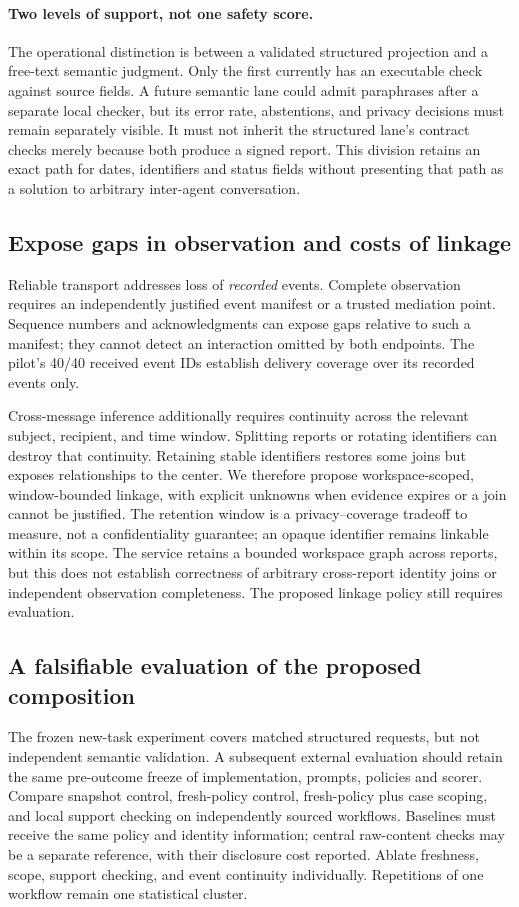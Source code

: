 \paragraph{Two levels of support, not one safety score.}
The operational distinction is between a validated structured projection and a
free-text semantic judgment. Only the first currently has an executable check
against source fields. A future semantic lane could admit paraphrases after a
separate local checker, but its error rate, abstentions, and privacy decisions
must remain separately visible. It must not inherit the structured lane's
contract checks merely because both produce a signed report. This division
retains an exact path for dates, identifiers and status fields without presenting
that path as a solution to arbitrary inter-agent conversation.

\subsection{Expose gaps in observation and costs of linkage}
Reliable transport addresses loss of \emph{recorded} events. Complete observation
requires an independently justified event manifest or a trusted mediation point.
Sequence numbers and acknowledgments can expose gaps relative to such a manifest;
they cannot detect an interaction omitted by both endpoints. The pilot's 40/40
received event IDs establish delivery coverage over its recorded events only.

Cross-message inference additionally requires continuity across the relevant
subject, recipient, and time window. Splitting reports or rotating identifiers
can destroy that continuity. Retaining stable identifiers restores some joins
but exposes relationships to the center. We therefore propose workspace-scoped,
window-bounded linkage, with explicit unknowns when evidence expires or a join
cannot be justified. The retention window is a privacy--coverage tradeoff to
measure, not a confidentiality guarantee; an opaque identifier remains linkable
within its scope. The service retains a bounded workspace graph across reports, but this does not
establish correctness of arbitrary cross-report identity joins or independent
observation completeness. The proposed linkage policy still requires evaluation.



\subsection{A falsifiable evaluation of the proposed composition}
The frozen new-task experiment covers matched structured requests, but not
independent semantic validation. A subsequent external evaluation should retain
the same pre-outcome freeze of implementation, prompts, policies and scorer.
Compare snapshot control, fresh-policy control, fresh-policy plus case scoping,
and local support checking on independently sourced workflows. Baselines must receive the same policy and identity information;
central raw-content checks may be a separate reference, with their disclosure
cost reported. Ablate freshness, scope, support checking, and event continuity
individually. Repetitions of one workflow remain one statistical cluster.

